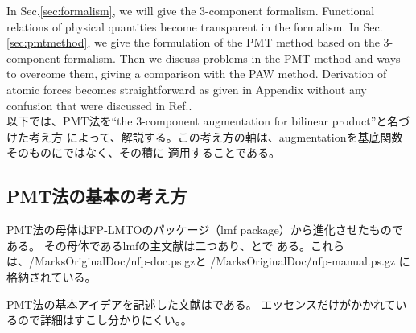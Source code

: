 \documentclass[a4paper,10pt,aip,onecolumn,amsmath,amssymb,floatfix,rmp]{revtex4-1}
\newcommand{\refsec}[1]{\mbox{Sec.~\!\ref{#1}}}
\def\smh{smHankel}
\begin{document}
In Sec.\ref{sec:formalism}, we will give the 3-component formalism.
Functional relations of physical quantities become transparent in the formalism.
In Sec.\ref{sec:pmtmethod}, we give the formulation of the PMT method
based on the 3-component formalism. Then we discuss problems
in the PMT method and ways to overcome them, giving a comparison with the PAW method.
Derivation of atomic forces becomes straightforward as given in Appendix
without any confusion that were discussed in Ref..\\


以下では、PMT法を``the 3-component augmentation for bilinear product''と名づけた考え方
によって、解説する。この考え方の軸は、augmentationを基底関数そのものにではなく、その積に
適用することである。

\subsection{PMT法の基本の考え方}
PMT法の母体はFP-LMTOのパッケージ（lmf package）から進化させたものである。
その母体であるlmfの主文献は二つあり、\cite{lmfchap}と\cite{nfpmanual}で
ある。これらは、/MarksOriginalDoc/nfp-doc.ps.gzと
/MarksOriginalDoc/nfp-manual.ps.gz
に格納されている。


PMT法の基本アイデアを記述した文献は\cite{pmt1}である。
エッセンスだけがかかれているので詳細はすこし分かりにくい。。
\end{document}
